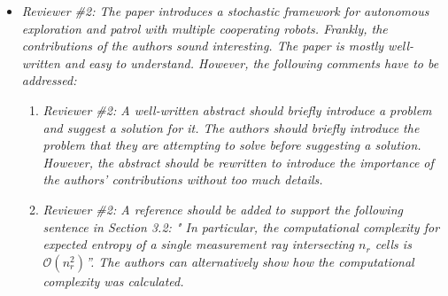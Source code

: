 \documentclass[11pt]{article}
\newenvironment{correction}{\begin{list}{}{\setlength{\leftmargin}{1cm}\setlength{\rightmargin}{1cm}}\vspace{\parsep}\item[]``}{''\end{list}}
\begin{document}
\begin{itemize}\setlength{\itemsep}{2\parsep}


\item {\itshape Reviewer \#2: The paper introduces a stochastic framework for autonomous exploration and patrol with multiple cooperating robots. Frankly, the contributions of the authors sound interesting.  The paper is mostly well-written and easy to understand. However, the following comments have to be addressed:}

\begin{enumerate}\setlength{\itemsep}{2\parsep}

\item {\itshape Reviewer \#2: A well-written abstract should briefly introduce a problem and suggest a solution for it. The authors should briefly introduce the problem that they are attempting to solve before suggesting a solution. However,  the abstract should be rewritten to introduce the importance of the authors' contributions without too much details.}

%
%


\item {\itshape Reviewer \#2: A reference should be added to support the following sentence in Section 3.2: " In particular, the computational complexity for expected entropy of a single measurement ray intersecting $n_r$ cells is $\mathcal{O}(n_r^2)$''. The authors can alternatively show how the computational complexity was calculated.}


\end{enumerate}
\end{itemize}
\end{document}
